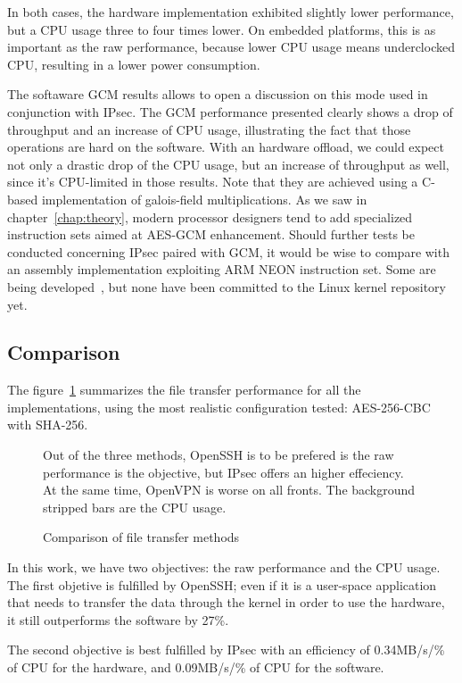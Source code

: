 In both cases, the hardware implementation exhibited slightly lower performance, but a CPU usage three to four times lower.
On embedded platforms, this is as important as the raw performance, because lower CPU usage means underclocked CPU, resulting in a lower power consumption.

The softaware GCM results allows to open a discussion on this mode used in conjunction with IPsec.
The GCM performance presented clearly shows a drop of throughput and an increase of CPU usage, illustrating the fact that those operations are hard on the software.
With an hardware offload, we could expect not only a drastic drop of the CPU usage, but an increase of throughput as well, since it's CPU-limited in those results.
Note that they are achieved using a C-based implementation of galois-field multiplications.
As we saw in chapter~\ref{chap:theory}, modern processor designers tend to add specialized instruction sets aimed at AES-GCM enhancement.
Should further tests be conducted concerning IPsec paired with GCM, it would be wise to compare with an assembly implementation exploiting ARM NEON instruction set.
Some are being developed~\cite{Conrado2013,Danilo2013}, but none have been committed to the Linux kernel repository yet.


\subsection{Comparison}
The figure~\ref{fig:ftp-bench-comparison} summarizes the file transfer performance for all the implementations, using the most realistic configuration tested: AES-256-CBC with SHA-256.
\begin{figure}[ht]

\caption{Comparison of file transfer methods}{Out of the three methods, OpenSSH is to be prefered is the raw performance is the objective, but IPsec offers an higher effeciency. At the same time, OpenVPN is worse on all fronts. The background stripped bars are the CPU usage.}
\label{fig:ftp-bench-comparison}
\end{figure}

In this work, we have two objectives: the raw performance and the CPU usage.
The first objetive is fulfilled by OpenSSH; even if it is a user-space application that needs to transfer the data through the kernel in order to use the hardware, it still outperforms the software by 27\%.

\noindent The second objective is best fulfilled by IPsec with an efficiency of 0.34MB/s/\% of CPU for the hardware, and 0.09MB/s/\% of CPU for the software.

